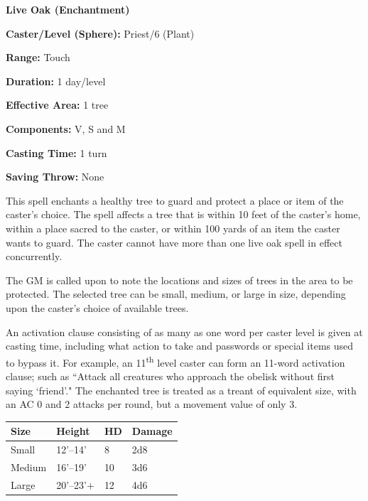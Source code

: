 \begin{multicols}{2}
\vspace{1em}

\noindent
\begin{minipage}{\columnwidth}

\noindent \textbf{Live Oak (Enchantment)}

\noindent \textbf{Caster/Level (Sphere):} Priest/6 (Plant)

\noindent \textbf{Range:} Touch

\noindent \textbf{Duration:} 1 day/level

\noindent \textbf{Effective Area:} 1 tree

\noindent \textbf{Components:} V, S and M

\noindent \textbf{Casting Time:} 1 turn

\noindent \textbf{Saving Throw:} None

\end{minipage}

This spell enchants a healthy tree to guard and protect a place or item of the caster's choice.  The spell affects a tree that is within 10 feet of the caster's home, within a place sacred to the caster, or within 100 yards of an item the caster wants to guard.  The caster cannot have more than one live oak spell in effect concurrently.

The GM is called upon to note the locations and sizes of trees in the area to be protected.  The selected tree can be small, medium, or large in size, depending upon the caster's choice of available trees.  

An activation clause consisting of as many as one word per caster level is given at casting time, including what action to take and passwords or special items used to bypass it.  For example, an 11\textsuperscript{th} level caster can form an 11-word activation clause; such as ``Attack all creatures who approach the obelisk without first saying `friend'."  The enchanted tree is treated as a treant of equivalent size, with an AC 0 and 2 attacks per round, but a movement value of only 3.

\noindent
\begin{tabular}{|p{}|p{}|p{}|p{}|}
\hline
Size	& Height	& HD	& Damage \\
\hline\hline
\rowcolor[gray]{.9}Small	& 12'--14'	& 8	& 2d8 \\
Medium	& 16'--19'	& 10	& 3d6 \\
\rowcolor[gray]{.9}Large	& 20'--23'+	& 12	& 4d6 \\
\hline
\end{tabular}


\end{multicols}
